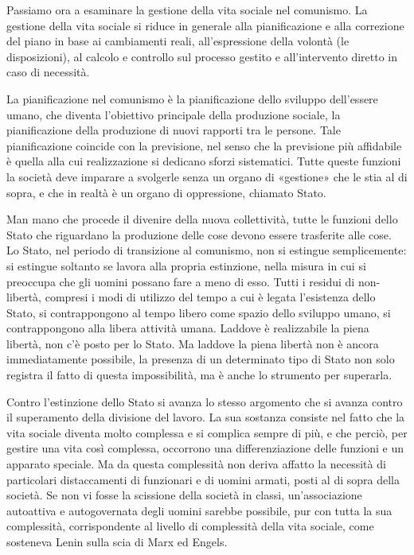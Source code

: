 \documentclass[12pt,a4paper,openany]{book}
\begin{document}
Passiamo ora a esaminare la gestione della vita sociale nel comunismo. La gestione della vita sociale si riduce in generale alla pianificazione e alla correzione del piano in base ai cambiamenti reali, all'espressione della volontà (le disposizioni), al calcolo e controllo sul processo gestito e all'intervento diretto in caso di necessità.

La pianificazione nel comunismo è la pianificazione dello sviluppo dell'essere umano, che diventa l'obiettivo principale della produzione sociale, la pianificazione della produzione di nuovi rapporti tra le persone. Tale pianificazione coincide con la previsione, nel senso che la previsione più affidabile è quella alla cui realizzazione si dedicano sforzi sistematici. Tutte queste funzioni la società deve imparare a svolgerle senza un organo di «gestione» che le stia al di sopra, e che in realtà è un organo di oppressione, chiamato Stato.

Man mano che procede il divenire della nuova collettività, tutte le funzioni dello Stato che riguardano la produzione delle cose devono essere trasferite alle cose. Lo Stato, nel periodo di transizione al comunismo, non si estingue semplicemente: si estingue soltanto se lavora alla propria estinzione, nella misura in cui si preoccupa che gli uomini possano fare a meno di esso. Tutti i residui di non-libertà, compresi i modi di utilizzo del tempo a cui è legata l'esistenza dello Stato, si contrappongono al tempo libero come spazio dello sviluppo umano, si contrappongono alla libera attività umana. Laddove è realizzabile la piena libertà, non c'è posto per lo Stato. Ma laddove la piena libertà non è ancora immediatamente possibile, la presenza di un determinato tipo di Stato non solo registra il fatto di questa impossibilità, ma è anche lo strumento per superarla.

Contro l'estinzione dello Stato si avanza lo stesso argomento che si avanza contro il superamento della divisione del lavoro. La sua sostanza consiste nel fatto che la vita sociale diventa molto complessa e si complica sempre di più, e che perciò, per gestire una vita così complessa, occorrono una differenziazione delle funzioni e un apparato speciale. Ma da questa complessità non deriva affatto la necessità di particolari distaccamenti di funzionari e di uomini armati, posti al di sopra della società. Se non vi fosse la scissione della società in classi, un'associazione autoattiva e autogovernata degli uomini sarebbe possibile, pur con tutta la sua complessità, corrispondente al livello di complessità della vita sociale, come sosteneva Lenin sulla scia di Marx ed Engels.
\end{document}
